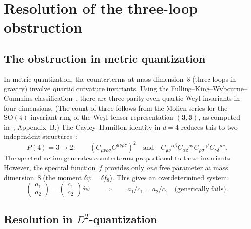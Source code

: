 \documentclass[12pt,a4paper]{article}
\theoremstyle{definition}
\theoremstyle{remark}
\newcommand{\Weylsq}{C_{\mu\nu\rho\sigma}C^{\mu\nu\rho\sigma}}
\begin{document}
\section{Resolution of the three-loop obstruction}
\label{sec:three_loop}

\subsection{The obstruction in metric quantization}

In metric quantization, the counterterms at mass dimension~8 (three loops in
gravity) involve quartic curvature invariants.  Using the Fulling--King--Wybourne--Cummins
classification~\cite{Fulling:1992vm}, there are three parity-even quartic Weyl
invariants in four dimensions.  (The count of three follows from the Molien
series for the $\mathrm{SO}(4)$ invariant ring of the Weyl tensor
representation $(\mathbf{3},\mathbf{3})$, as computed
in~\cite{Alfyorov:2026ct}, Appendix~B.)  The Cayley--Hamilton identity in $d = 4$
reduces this to two independent structures~\cite{Alfyorov:2026ct}:
\begin{equation}\label{eq:quartic_metric}
  P(4) = 3 \to 2: \qquad
  (\Weylsq)^2 \quad\text{and}\quad
  C_{\mu\nu}{}^{\alpha\beta}C_{\alpha\beta}{}^{\rho\sigma}
  C_{\rho\sigma}{}^{\gamma\delta}C_{\gamma\delta}{}^{\mu\nu}.
\end{equation}
The spectral action generates counterterms proportional to these invariants.
However, the spectral function~$f$ provides only \emph{one} free parameter at
mass dimension~8 (the moment $\delta\psi = \delta f_8$).  This gives an
overdetermined system:
\begin{equation}\label{eq:overdetermined}
  \begin{pmatrix} a_1 \\ a_2 \end{pmatrix}
  = \begin{pmatrix} c_1 \\ c_2 \end{pmatrix}\delta\psi
  \qquad \Longrightarrow \qquad
  a_1/c_1 = a_2/c_2 \quad \text{(generically fails)}.
\end{equation}

\subsection{Resolution in $D^2$-quantization}
\end{document}
